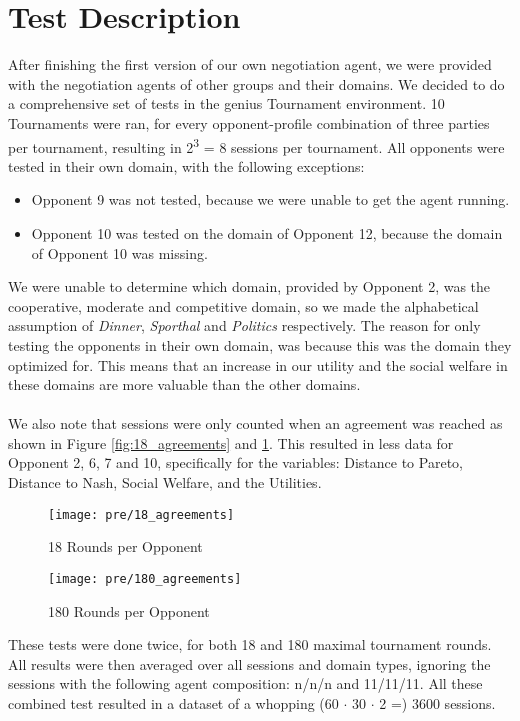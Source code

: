 \section{Test Description}

After finishing the first version of our own negotiation agent, we were provided with the negotiation agents of other groups and their domains. We decided to do a comprehensive set of tests in the genius Tournament environment. 10 Tournaments were ran, for every opponent-profile combination of three parties per tournament, resulting in 2\textsuperscript{3} = 8 sessions per tournament. All opponents were tested in their own domain, with the following exceptions:

\begin{itemize}
	\item Opponent 9 was not tested, because we were unable to get the agent running. 
	\item Opponent 10 was tested on the domain of Opponent 12, because the domain of Opponent 10 was missing.
\end{itemize}

\noindent
We were unable to determine which domain, provided by Opponent 2, was the cooperative, moderate and competitive domain, so we made the alphabetical assumption of \textit{Dinner}, \textit{Sporthal} and \textit{Politics} respectively. The reason for only testing the opponents in their own domain, was because this was the domain they optimized for. This means that an increase in our utility and the social welfare in these domains are more valuable than the other domains.
\\\\
We also note that sessions were only counted when an agreement was reached as shown in Figure \ref{fig:18_agreements} and \ref{fig:180_agreements}. This resulted in less data for Opponent 2, 6, 7 and 10, specifically for the variables: Distance to Pareto, Distance to Nash, Social Welfare, and the Utilities.

\begin{figure}[!htb]
	\texttt{[image: pre/18\_agreements]}
	\caption{18 Rounds per Opponent}
	\label{fig:18_agreements}
	\endminipage\hfill
	\texttt{[image: pre/180\_agreements]}
	\caption{180 Rounds per Opponent}
	\label{fig:180_agreements}
	\endminipage\hfill
\end{figure}

\noindent
These tests were done twice, for both 18 and 180 maximal tournament rounds.
All results were then averaged over all sessions and domain types, ignoring the sessions with the following agent composition: n/n/n and 11/11/11. All these combined test resulted in a dataset of a whopping (60 $\cdot$ 30 $\cdot$ 2 =) 3600 sessions.